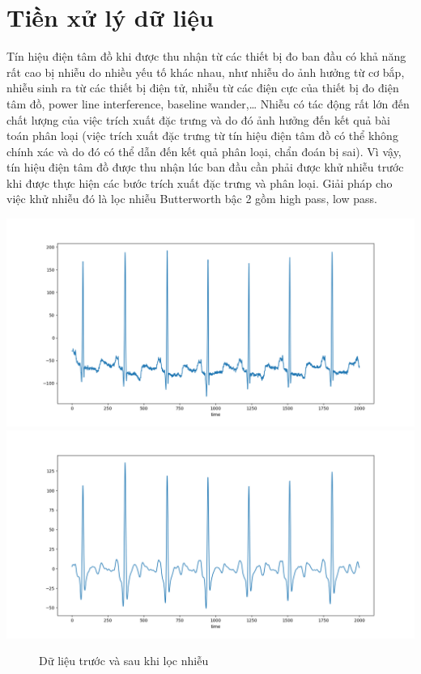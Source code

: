 \section{Tiền xử lý dữ liệu}
Tín hiệu điện tâm đồ khi được thu nhận từ các thiết bị đo ban đầu có khả năng rất cao bị nhiễu do nhiều yếu tố khác nhau, như nhiễu do ảnh hưởng từ cơ bắp, nhiễu sinh ra từ các thiết bị điện tử, nhiễu từ các điện cực của thiết bị đo điện tâm đồ, power line interference, baseline wander,… Nhiễu có tác động rất lớn đến chất lượng của việc trích xuất đặc trưng và do đó ảnh hưởng đến kết quả bài toán phân loại (việc trích xuất đặc trưng từ tín hiệu điện tâm đồ có thể không chính xác và do đó có thể dẫn đến kết quả phân loại, chẩn đoán bị sai). Vì vậy, tín hiệu điện tâm đồ được thu nhận lúc ban đầu cần phải được khử nhiễu trước khi được thực hiện các bước trích xuất đặc trưng và phân loại. Giải pháp cho việc khử nhiễu đó là lọc nhiễu Butterworth bậc 2 gồm high pass, low pass.
\begin{center}
         \includegraphics[width=1.\linewidth]{image/chapter5/noise.png}
         \includegraphics[width=1.\linewidth]{image/chapter5/hlp.png}
    \begin{figure}[!htb]
       \caption{Dữ liệu trước và sau khi lọc nhiễu}
    \end{figure}
\end{center}

